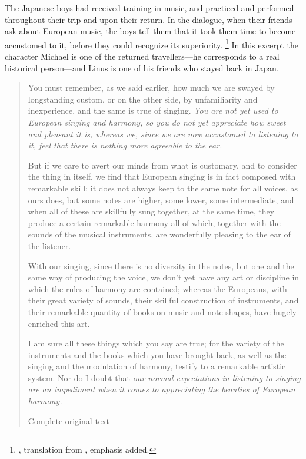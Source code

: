 The Japanese boys had received training in music, and practiced and performed throughout their trip and upon their return.
In the dialogue, when their friends ask about European music, the boys tell them that it took them time to become accustomed to it, before they could recognize its superiority.%
  \footnote{\autocite[109--110]{Sande:DeMissioneLegatorum}, translation from \autocite[155-156]{Massarella:JapaneseTravellers}, emphasis added.}
In this excerpt the character Michael is one of the returned travellers---he corresponds to a real historical person---and Linus is one of his friends who stayed back in Japan.

\begin{quotation}
You must remember, as we said earlier, how much we are swayed by longstanding custom, or on the other side, by unfamiliarity and inexperience, and the same is true of singing. 
\emph{You are not yet used to European singing and harmony, so you do not yet appreciate how sweet and pleasant it is, whereas we, since we are now accustomed to listening to it, feel that there is nothing more agreeable to the ear.}

But if we care to avert our minds from what is customary, and to consider the thing in itself, we find that European singing is in fact composed with remarkable skill; 
it does not always keep to the same note for all voices, as ours does, but some notes are higher, some lower, some intermediate, and when all of these are skillfully sung together, at the same time, they produce a certain remarkable harmony \Dots{} 
all of which, \Dots{} together with the sounds of the musical instruments, are wonderfully pleasing to the ear of the listener. \Dots{}

With our singing, since there is no diversity in the notes, but one and the same way of producing the voice, we don't yet have any art or discipline in which the rules of harmony are contained; 
whereas the Europeans, with their great variety of sounds, their skillful construction of instruments, and their remarkable quantity of books on music and note shapes, have hugely enriched this art.

I am sure all these things which you say are true; for the variety of the instruments and the books which you have brought back, as well as the singing and the modulation of harmony, testify to a remarkable artistic system.
Nor do I doubt that \emph{our normal expectations in listening to singing are an impediment when it comes to appreciating the beauties of European harmony.}%
  \begin{Footnote}
  {\XXX Complete original text}
  \end{Footnote}
\end{quotation}

